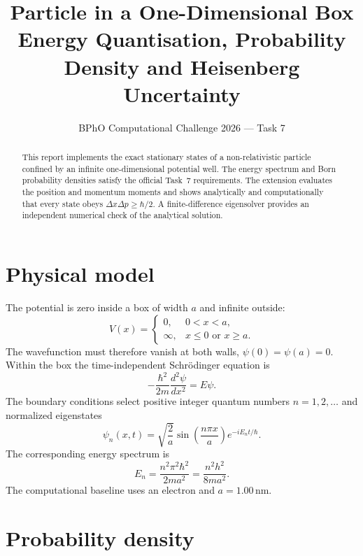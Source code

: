 \documentclass[11pt,a4paper]{article}
\title{\textbf{Particle in a One-Dimensional Box}\\
\large Energy Quantisation, Probability Density and Heisenberg Uncertainty}
\author{BPhO Computational Challenge 2026 --- Task 7}
\date{}
\begin{document}
\maketitle

\begin{abstract}
This report implements the exact stationary states of a non-relativistic
particle confined by an infinite one-dimensional potential well.  The energy
spectrum and Born probability densities satisfy the official Task~7
requirements.  The extension evaluates the position and momentum moments and
shows analytically and computationally that every state obeys
$\Delta x\Delta p\geq\hbar/2$.  A finite-difference eigensolver provides an
independent numerical check of the analytical solution.
\end{abstract}

\section{Physical model}

The potential is zero inside a box of width $a$ and infinite outside:
\begin{equation}
V(x)=
\begin{cases}
0, & 0<x<a,\\
\infty, & x\leq0\text{ or }x\geq a.
\end{cases}
\end{equation}
The wavefunction must therefore vanish at both walls,
$\psi(0)=\psi(a)=0$.  Within the box the time-independent Schr\"odinger
equation is
\begin{equation}
-\frac{\hbar^2}{2m}\frac{d^2\psi}{dx^2}=E\psi.
\end{equation}
The boundary conditions select positive integer quantum numbers
$n=1,2,\ldots$ and normalized eigenstates
\begin{equation}
\psi_n(x,t)=\sqrt{\frac{2}{a}}
\sin\!\left(\frac{n\pi x}{a}\right)e^{-iE_nt/\hbar}.
\end{equation}
The corresponding energy spectrum is
\begin{equation}
E_n=\frac{n^2\pi^2\hbar^2}{2ma^2}
=\frac{n^2h^2}{8ma^2}.
\label{eq:energy}
\end{equation}
The computational baseline uses an electron and $a=1.00\,\mathrm{nm}$.

\section{Probability density}
\end{document}
